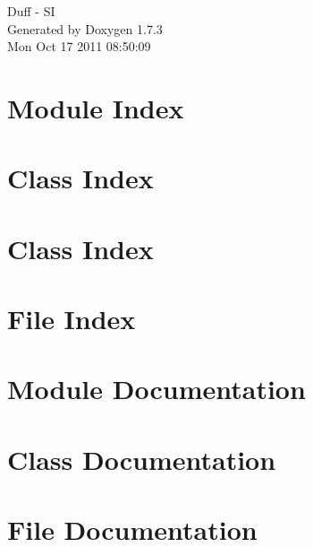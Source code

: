 \documentclass[a4paper]{book}
\begin{document}
\hypersetup{pageanchor=false}
\begin{titlepage}
\vspace*{7cm}
\begin{center}
{\Large Duff -\/ SI }\\
\vspace*{1cm}
{\large Generated by Doxygen 1.7.3}\\
\vspace*{0.5cm}
{\small Mon Oct 17 2011 08:50:09}\\
\end{center}
\end{titlepage}
\clearemptydoublepage
{}
\tableofcontents
\clearemptydoublepage
{}
\hypersetup{pageanchor=true}
\chapter{Module Index}

\chapter{Class Index}

\chapter{Class Index}

\chapter{File Index}

\chapter{Module Documentation}

\chapter{Class Documentation}


















\chapter{File Documentation}







\printindex
\end{document}
